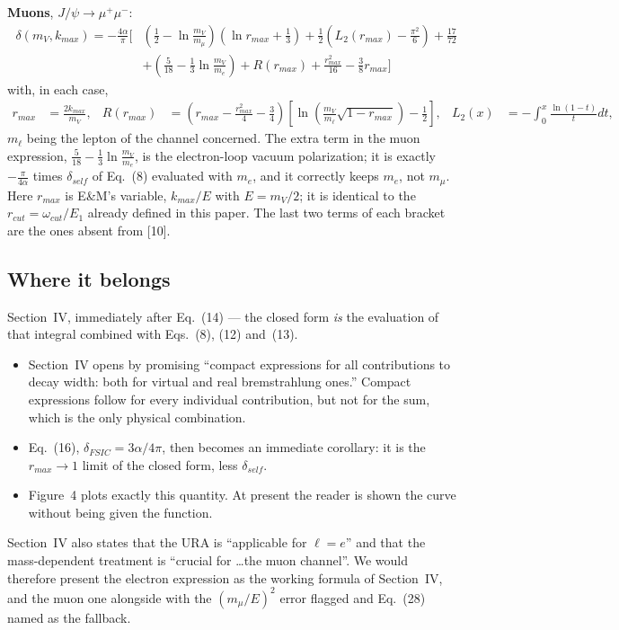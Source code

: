 \documentclass[11pt]{article}
\begin{document}
\textbf{Muons}, $J/\psi\to\mu^+\mu^-$:
\begin{equation*}
\boxed{\;
\begin{aligned}
\delta(m_V,k_{max})=-\frac{4\alpha}{\pi}
\Bigg[&
\left(\frac12-\ln\frac{m_V}{m_\mu}\right)\left(\ln r_{max}+\frac13\right)
+\frac12\left(L_2(r_{max})-\frac{\pi^{2}}{6}\right)
+\frac{17}{72}\\[2pt]
&+\left(\frac{5}{18}-\frac13\ln\frac{m_V}{m_e}\right)
+R(r_{max})
+\frac{r_{max}^{2}}{16}-\frac{3}{8}r_{max}
\Bigg]
\end{aligned}
\;}
\end{equation*}
with, in each case,
\begin{align*}
r_{max}&=\frac{2k_{max}}{m_V}, &
R(r_{max})&=\left(r_{max}-\frac{r_{max}^{2}}{4}-\frac34\right)
\left[\ln\!\left(\frac{m_V}{m_\ell}\sqrt{1-r_{max}}\right)-\frac12\right], &
L_2(x)&=-\int_0^x\frac{\ln(1-t)}{t}dt,
\end{align*}
$m_\ell$ being the lepton of the channel concerned. The extra term in the muon
expression, $\frac{5}{18}-\frac13\ln\frac{m_V}{m_e}$, is the electron-loop vacuum
polarization; it is exactly $-\frac{\pi}{4\alpha}$ times $\delta_{self}$ of
Eq.~(8) evaluated with $m_e$, and it correctly keeps $m_e$, not $m_\mu$. Here
$r_{max}$ is E\&M's variable, $k_{max}/E$ with $E=m_V/2$; it is identical to the
$r_{cut}=\omega_{cut}/E_1$ already defined in this paper. The last two terms of
each bracket are the ones absent from [10].

\subsection*{Where it belongs}

Section~IV, immediately after Eq.~(14) --- the closed form \emph{is} the
evaluation of that integral combined with Eqs.~(8), (12) and~(13).
\begin{itemize}\itemsep2pt
\item Section~IV opens by promising ``compact expressions for all contributions
      to decay width: both for virtual and real bremstrahlung ones.'' Compact
      expressions follow for every individual contribution, but not for the sum,
      which is the only physical combination.
\item Eq.~(16), $\delta_{FSIC}=3\alpha/4\pi$, then becomes an immediate corollary:
      it is the $r_{max}\to1$ limit of the closed form, less $\delta_{self}$.
\item Figure~4 plots exactly this quantity. At present the reader is shown the
      curve without being given the function.
\end{itemize}
Section~IV also states that the URA is ``applicable for $\ell=e$'' and that the
mass-dependent treatment is ``crucial for \ldots the muon channel''. We would
therefore present the electron expression as the working formula of Section~IV,
and the muon one alongside with the $(m_\mu/E)^{2}$ error flagged and Eq.~(28)
named as the fallback.
\end{document}
